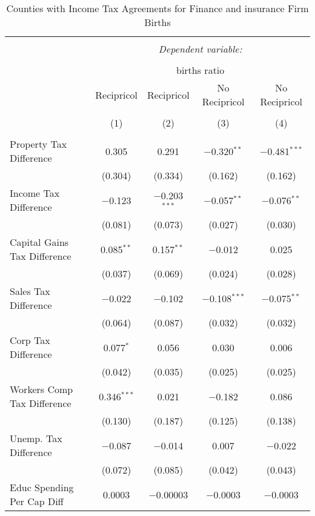 
\begin{table}[!htbp] \centering 
  \caption{Counties with Income Tax Agreements for  Finance and insurance Firm Births} 
  \label{52rd} 
\begin{tabular}{@{\extracolsep{5pt}}lcccc} 
\\[-1.8ex]\hline 
\hline \\[-1.8ex] 
 & \multicolumn{4}{c}{\textit{Dependent variable:}} \\ 
\cline{2-5} 
\\[-1.8ex] & \multicolumn{4}{c}{births ratio} \\ 
 & Recipricol & Recipricol & No Recipricol & No Recipricol \\ 
\\[-1.8ex] & (1) & (2) & (3) & (4)\\ 
\hline \\[-1.8ex] 
 Property Tax Difference & 0.305 & 0.291 & $-$0.320$^{**}$ & $-$0.481$^{***}$ \\ 
  & (0.304) & (0.334) & (0.162) & (0.162) \\ 
  Income Tax Difference & $-$0.123 & $-$0.203$^{***}$ & $-$0.057$^{**}$ & $-$0.076$^{**}$ \\ 
  & (0.081) & (0.073) & (0.027) & (0.030) \\ 
  Capital Gains Tax Difference & 0.085$^{**}$ & 0.157$^{**}$ & $-$0.012 & 0.025 \\ 
  & (0.037) & (0.069) & (0.024) & (0.028) \\ 
  Sales Tax Difference & $-$0.022 & $-$0.102 & $-$0.108$^{***}$ & $-$0.075$^{**}$ \\ 
  & (0.064) & (0.087) & (0.032) & (0.032) \\ 
  Corp Tax Difference & 0.077$^{*}$ & 0.056 & 0.030 & 0.006 \\ 
  & (0.042) & (0.035) & (0.025) & (0.025) \\ 
  Workers Comp Tax Difference & 0.346$^{***}$ & 0.021 & $-$0.182 & 0.086 \\ 
  & (0.130) & (0.187) & (0.125) & (0.138) \\ 
  Unemp. Tax Difference & $-$0.087 & $-$0.014 & 0.007 & $-$0.022 \\ 
  & (0.072) & (0.085) & (0.042) & (0.043) \\ 
  Educ Spending Per Cap Diff & 0.0003 & $-$0.00003 & $-$0.0003 & $-$0.0003 \\ 

\end{tabular}
\end{table}

